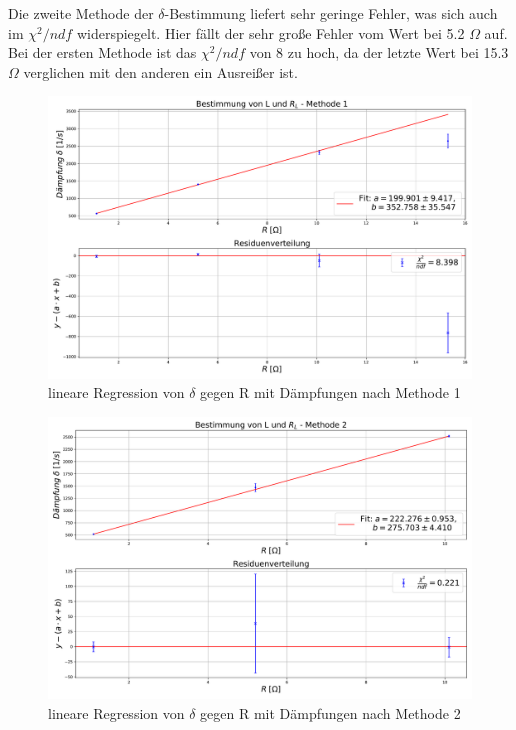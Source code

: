 \documentclass[a4paper, 11pt]{article}
\begin{document}
Die zweite Methode der $\delta$-Bestimmung liefert sehr geringe Fehler, was sich auch im $\chi^2/ndf$ widerspiegelt. Hier fällt der sehr große Fehler vom Wert bei 5.2 $\Omega$ auf. Bei der ersten Methode ist das $\chi^2/ndf$ von 8 zu hoch, da der letzte Wert bei 15.3 $\Omega$ verglichen mit den anderen ein Ausreißer ist.



\begin{figure}[H]
	\centering
	\includegraphics[scale=0.4]{../Plots/BestimmungLR_LMethode1.pdf}
	\caption{lineare Regression von $\delta$ gegen R mit Dämpfungen nach Methode 1}
	\label{fig:Spule1}
\end{figure}

\begin{figure}[H]
	\centering
	\includegraphics[scale=0.4]{../Plots/BestimmungLR_LMethode2.pdf}
	\caption{lineare Regression von $\delta$ gegen R mit Dämpfungen nach Methode 2}
	\label{fig:Spule2}
\end{figure}
\end{document}

